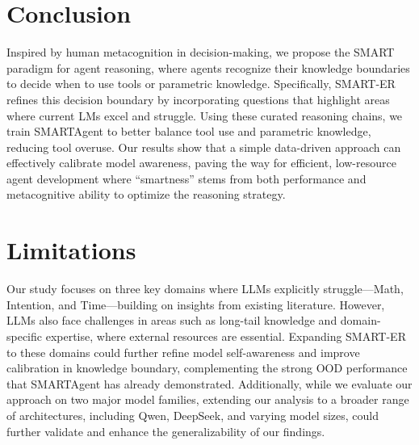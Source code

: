 \section{Conclusion}
Inspired by human metacognition in decision-making, we propose the SMART paradigm for agent reasoning, where agents recognize their knowledge boundaries to decide when to use tools or parametric knowledge. Specifically, SMART-ER refines this decision boundary by incorporating questions that highlight areas where current LMs excel and struggle. Using these curated reasoning chains, we train SMARTAgent to better balance tool use and parametric knowledge, reducing tool overuse. Our results show that a simple data-driven approach can effectively calibrate model awareness, paving the way for efficient, low-resource agent development where ``smartness'' stems from both performance and metacognitive ability to optimize the reasoning strategy.

\section*{Limitations}
Our study focuses on three key domains where LLMs explicitly struggle—Math, Intention, and Time—building on insights from existing literature. However, LLMs also face challenges in areas such as long-tail knowledge and domain-specific expertise, where external resources are essential. Expanding SMART-ER to these domains could further refine model self-awareness and improve calibration in knowledge boundary, complementing the strong OOD  performance that SMARTAgent has already demonstrated. Additionally, while we evaluate our approach on two major model families, extending our analysis to a broader range of architectures, including Qwen, DeepSeek, and varying model sizes, could further validate and enhance the generalizability of our findings.
